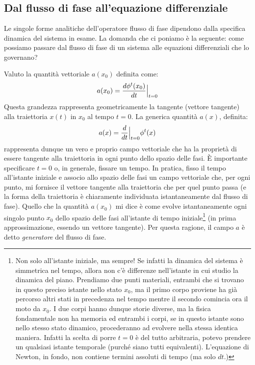 \documentclass[a4paper,openany]{article}
\begin{document}
	\subsection{Dal flusso di fase all'equazione differenziale}
	Le singole forme analitiche dell'operatore flusso di fase dipendono dalla specifica dinamica del sistema in esame. La domanda che ci poniamo è la seguente: come possiamo passare dal flusso di fase di un sistema alle equazioni differenziali che lo governano?
	
	Valuto la quantità vettoriale $a(x_{0})$ definita come:
	\begin{equation}
		a(x_{0})=\dfrac{d\phi^{t}(x_{0})}{dt}\Bigl|_{t=0} 
	\end{equation}  
	Questa grandezza rappresenta geometricamente la tangente (vettore tangente) alla traiettoria $x(t)$ in $x_{0}$ al tempo $t=0$. La generica quantità $a(x)$, definita:
	\begin{equation}
		a(x) = \dfrac{d}{dt}\Bigl|_{t=0}\phi^{t}(x)
	\end{equation}
	rappresenta dunque un vero e proprio campo vettoriale che ha la proprietà di essere tangente alla traiettoria in ogni punto dello spazio delle fasi. È importante specificare $t=0$ o, in generale, fissare un tempo. In pratica, fisso il tempo all'istante iniziale e associo allo spazio delle fasi un campo vettoriale che, per ogni punto, mi fornisce il vettore tangente alla traiettoria che per quel punto passa (e la forma della traiettoria è chiaramente individuata istantaneamente dal flusso di fase). Quello che la quantità $a(x_{0})$ mi dice è come evolve istantaneamente ogni singolo punto $x_{0}$ dello spazio delle fasi all'istante di tempo iniziale\footnote{Non solo all'istante iniziale, ma sempre! Se infatti la dinamica del sistema è simmetrica nel tempo, allora non c'è differenze nell'istante in cui studio la dinamica del piano. Prendiamo due punti materiali, entrambi che si trovano in questo preciso istante nello stato $x_0$, ma il primo corpo proviene ha già percorso altri stati in precedenza nel tempo mentre il secondo comincia ora il moto da $x_0$. I due corpi hanno dunque storie diverse, ma la fisica fondamentale non ha memoria ed entrambi i corpi, se in questo istante sono nello stesso stato dinamico, procederanno ad evolvere nella stessa identica maniera. Infatti la scelta di porre $t=0$ è del tutto arbitraria, potevo prendere un qualsiasi istante temporale (purché siano tutti equivalenti). L'equazione di Newton, in fondo, non contiene termini assoluti di tempo (ma solo $dt$.)} (in prima approssimazione, essendo un vettore tangente). Per questa ragione, il campo $a$ è detto \textit{generatore} del flusso di fase.
	
\end{document}
